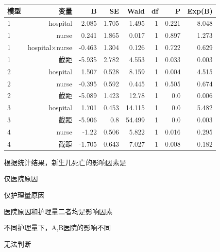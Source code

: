 \begin{center}\small\setlength{\tabcolsep}{3.5pt}\renewcommand{\arraystretch}{1.18}\begin{tabular}{@{}lrrrrrrr@{}}
\toprule
模型 & 变量 & B & SE & Wald & df & P & Exp(B) \\
\midrule

1 & hospital & 2.085 & 1.705 & 1.495 & 1 & 0.221 & 8.048 \\
1 & nurse & 0.241 & 1.865 & 0.017 & 1 & 0.897 & 1.273 \\
1 & hospital×nurse & -0.463 & 1.304 & 0.126 & 1 & 0.722 & 0.629 \\
1 & 截距 & -5.935 & 2.782 & 4.553 & 1 & 0.033 & 0.003 \\
2 & hospital & 1.507 & 0.528 & 8.159 & 1 & 0.004 & 4.515 \\
2 & nurse & -0.395 & 0.592 & 0.445 & 1 & 0.505 & 0.674 \\
2 & 截距 & -5.089 & 1.423 & 12.78 & 1 & 0.0 & 0.006 \\
3 & hospital & 1.701 & 0.453 & 14.115 & 1 & 0.0 & 5.482 \\
3 & 截距 & -5.906 & 0.8 & 54.499 & 1 & 0.0 & 0.003 \\
4 & nurse & -1.22 & 0.506 & 5.822 & 1 & 0.016 & 0.295 \\
4 & 截距 & -1.705 & 0.643 & 7.027 & 1 & 0.008 & 0.182 \\
\bottomrule\end{tabular}\end{center}


\par\addvspace{8pt}\noindent\begin{minipage}{\linewidth}


根据统计结果，新生儿死亡的影响因素是


\begin{choices}

\item 仅医院原因

\item 仅护理量原因

\item 医院原因和护理量二者均是影响因素

\item 不同护理量下，A,B医院的影响不同

\item 无法判断

\end{choices}

\end{minipage}\par\vspace{5pt}


